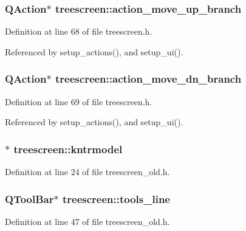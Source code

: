 \subsubsection{\setlength{\rightskip}{0pt plus 5cm}QAction$\ast$ {\bf treescreen::action\_\-move\_\-up\_\-branch}\hspace{0.3cm}{\tt  [private]}}\label{classtreescreen_449dbf929f24f5d7053a44f466ad949c}




Definition at line 68 of file treescreen.h.

Referenced by setup\_\-actions(), and setup\_\-ui().
\subsubsection{\setlength{\rightskip}{0pt plus 5cm}QAction$\ast$ {\bf treescreen::action\_\-move\_\-dn\_\-branch}\hspace{0.3cm}{\tt  [private]}}\label{classtreescreen_726867917db47c0873f1e3e05c7101be}




Definition at line 69 of file treescreen.h.

Referenced by setup\_\-actions(), and setup\_\-ui().
\subsubsection{$\ast$ {\bf treescreen::kntrmodel}}\label{classtreescreen_9af96a0df5b4e075dd4fc01e0bd8e31d}




Definition at line 24 of file treescreen\_\-old.h.
\subsubsection{\setlength{\rightskip}{0pt plus 5cm}QTool\-Bar$\ast$ {\bf treescreen::tools\_\-line}\hspace{0.3cm}{\tt  [private]}}\label{classtreescreen_4b1c78bd36c3ce2a67c4aa082320b2f9}




Definition at line 47 of file treescreen\_\-old.h.
